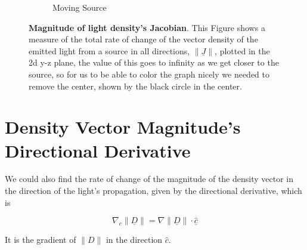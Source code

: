 \begin{figure}[H]
\begin{subfigure}{0.45\textwidth}
		\caption{Moving Source}
		\label{subfig_2: jacobian of vector density}
	\end{subfigure}
	\caption{\textbf{Magnitude of light density's Jacobian}. This Figure shows a measure of the total rate of change of the vector density of the emitted light from a source in all directions, $\| \underline{J} \|$, plotted in the 2d y-z plane, the value of this goes to infinity as we get closer to the source, so for us to be able to color the graph nicely we needed to remove the center, shown by the black circle in the center.}
	\label{fig: jacobian of vector density}
\end{figure}

\section{Density Vector Magnitude's Directional Derivative}\label{sect: Norm of the Gradient of the Density Vector Magnitude}

We could also find the rate of change of the magnitude of the density vector in the direction of the light's propagation, given by the directional derivative, which is

\begin{equation}
	\nabla_c \| \underline{D} \| = \nabla \| \underline{D} \| \cdot \hat{\underline{c}}
\end{equation}

It is the gradient of $\|D\|$ in the direction $\hat{c}$.





